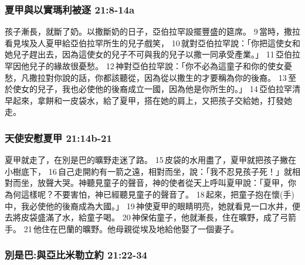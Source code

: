 \subsubsection{夏甲與以實瑪利被逐 21:8-14a}
\label{sec:YiShiMaLiBeiZhu}
孩子漸長，就斷了奶。以撒斷奶的日子，亞伯拉罕設擺豐盛的筵席。 9 當時，撒拉看見埃及人夏甲給亞伯拉罕所生的兒子戲笑， 10 就對亞伯拉罕說：「你把這使女和她兒子趕出去，因為這使女的兒子不可與我的兒子以撒一同承受產業。」 11 亞伯拉罕因他兒子的緣故很憂愁。 12 神對亞伯拉罕說：「你不必為這童子和你的使女憂愁，凡撒拉對你說的話，你都該聽從，因為從以撒生的才要稱為你的後裔。 13 至於使女的兒子，我也必使他的後裔成立一國，因為他是你所生的。」 14 亞伯拉罕清早起來，拿餅和一皮袋水，給了夏甲，搭在她的肩上，又把孩子交給她，打發她走。


\subsubsection{天使安慰夏甲 21:14b-21}
夏甲就走了，在別是巴的曠野走迷了路。 15 皮袋的水用盡了，夏甲就把孩子撇在小樹底下， 16 自己走開約有一箭之遠，相對而坐，說：「我不忍見孩子死！」就相對而坐，放聲大哭。神聽見童子的聲音，神的使者從天上呼叫夏甲說：「夏甲，你為何這樣呢？不要害怕，神已經聽見童子的聲音了。 18 起來，把童子抱在懷(手)中，我必使他的後裔成為大國。」 19 神使夏甲的眼睛明亮，她就看見一口水井，便去將皮袋盛滿了水，給童子喝。 20 神保佑童子，他就漸長，住在曠野，成了弓箭手。 21 他住在巴蘭的曠野。他母親從埃及地給他娶了一個妻子。

\subsubsection{別是巴:與亞比米勒立約 21:22-34}

